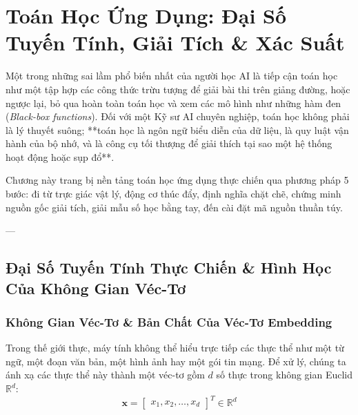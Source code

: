 
\chapter{Toán Học Ứng Dụng: Đại Số Tuyến Tính, Giải Tích \& Xác Suất}
\label{ch:applied-mathematics}

Một trong những sai lầm phổ biến nhất của người học AI là tiếp cận toán học như một tập hợp các công thức trừu tượng để giải bài thi trên giảng đường, hoặc ngược lại, bỏ qua hoàn toàn toán học và xem các mô hình như những hàm đen (\textit{Black-box functions}). Đối với một Kỹ sư AI chuyên nghiệp, toán học không phải là lý thuyết suông; **toán học là ngôn ngữ biểu diễn của dữ liệu, là quy luật vận hành của bộ nhớ, và là công cụ tối thượng để giải thích tại sao một hệ thống hoạt động hoặc sụp đổ**.

Chương này trang bị nền tảng toán học ứng dụng thực chiến qua phương pháp 5 bước: đi từ trực giác vật lý, động cơ thúc đẩy, định nghĩa chặt chẽ, chứng minh nguồn gốc giải tích, giải mẫu số học bằng tay, đến cài đặt mã nguồn thuần túy.

---

\section{Đại Số Tuyến Tính Thực Chiến \& Hình Học Của Không Gian Véc-Tơ}
\label{sec:linear-algebra-deepdive}

\subsection{Không Gian Véc-Tơ \& Bản Chất Của Véc-Tơ Embedding}

Trong thế giới thực, máy tính không thể hiểu trực tiếp các thực thể như một từ ngữ, một đoạn văn bản, một hình ảnh hay một gói tin mạng. Để xử lý, chúng ta ánh xạ các thực thể này thành một véc-tơ gồm $d$ số thực trong không gian Euclid $\mathbb{R}^d$:
\begin{equation}
\mathbf{x} = \begin{bmatrix} x_1, x_2, \dots, x_d \end{bmatrix}^T \in \mathbb{R}^d
\end{equation}

